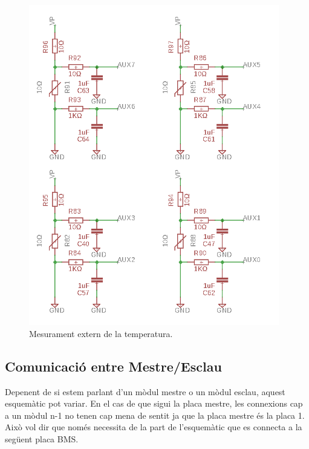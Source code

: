 \begin{figure}[H]
	\centering
    \includegraphics[width=\textwidth, height=14cm] {Prototip/schtemperatura.png}
    \caption{Mesurament extern de la temperatura.}
\end{figure}


\subsection{Comunicació entre Mestre/Esclau}

Depenent de si estem parlant d'un mòdul mestre o un mòdul esclau, aquest esquemàtic pot variar. En el cas de que sigui la placa mestre, les connexions cap a un mòdul n-1 no tenen cap mena de sentit ja que la placa mestre és la placa 1. Això vol dir que només necessita de la part de l'esquemàtic que es connecta a la següent placa BMS.

